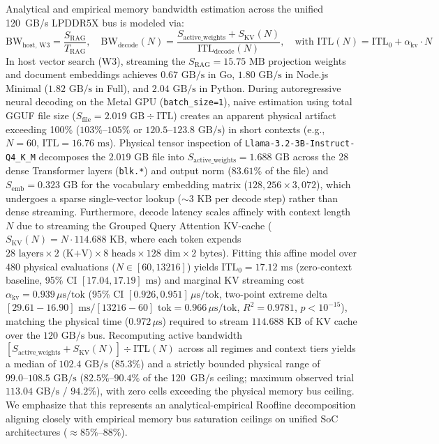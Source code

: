 \documentclass[preprint,12pt,3p]{elsarticle}
\begin{document}
Analytical and empirical memory bandwidth estimation across the unified 120~GB/s LPDDR5X bus is modeled via:
\begin{equation}
\text{BW}_{\text{host, W3}} = \frac{S_{\text{RAG}}}{T_{\text{RAG}}}, \quad \text{BW}_{\text{decode}}(N) = \frac{S_{\text{active\_weights}} + S_{\text{KV}}(N)}{\text{ITL}_{\text{decode}}(N)}, \quad \text{with } \text{ITL}(N) = \text{ITL}_0 + \alpha_{\text{kv}} \cdot N
\end{equation}
In host vector search (W3), streaming the $S_{\text{RAG}} = 15.75\text{ MB}$ projection weights and document embeddings achieves $0.67\text{ GB/s}$ in Go, $1.80\text{ GB/s}$ in Node.js Minimal ($1.82\text{ GB/s}$ in Full), and $2.04\text{ GB/s}$ in Python. During autoregressive neural decoding on the Metal GPU (\texttt{batch\_size=1}), naive estimation using total GGUF file size ($S_{\text{file}} = 2.019\text{ GB} \div \text{ITL}$) creates an apparent physical artifact exceeding 100\% ($103\%\text{--}105\%$ or $120.5\text{--}123.8\text{ GB/s}$) in short contexts (e.g., $N=60$, $\text{ITL} = 16.76\text{ ms}$). Physical tensor inspection of \texttt{Llama-3.2-3B-Instruct-Q4\_K\_M} decomposes the $2.019\text{ GB}$ file into $S_{\text{active\_weights}} = 1.688\text{ GB}$ across the 28 dense Transformer layers (\texttt{blk.*}) and output norm ($83.61\%$ of the file) and $S_{\text{emb}} = 0.323\text{ GB}$ for the vocabulary embedding matrix ($128{,}256 \times 3{,}072$), which undergoes a sparse single-vector lookup ($\sim 3\text{ KB}$ per decode step) rather than dense streaming. Furthermore, decode latency scales affinely with context length $N$ due to streaming the Grouped Query Attention KV-cache ($S_{\text{KV}}(N) = N \cdot 114.688\text{ KB}$, where each token expends $28\text{ layers} \times 2\text{ (K+V)} \times 8\text{ heads} \times 128\text{ dim} \times 2\text{ bytes}$). Fitting this affine model over 480 physical evaluations ($N \in [60, 13216]$) yields $\text{ITL}_0 = 17.12\text{ ms}$ (zero-context baseline, 95\% CI $[17.04, 17.19]\text{ ms}$) and marginal KV streaming cost $\alpha_{\text{kv}} = 0.939\,\mu\text{s/tok}$ (95\% CI $[0.926, 0.951]\,\mu\text{s/tok}$, two-point extreme delta $[29.61 - 16.90]\text{ ms} / [13216 - 60]\text{ tok} = 0.966\,\mu\text{s/tok}$, $R^2 = 0.9781$, $p < 10^{-15}$), matching the physical time ($0.972\,\mu\text{s}$) required to stream $114.688\text{ KB}$ of KV cache over the $120\text{ GB/s}$ bus. Recomputing active bandwidth $[S_{\text{active\_weights}} + S_{\text{KV}}(N)] \div \text{ITL}(N)$ across all regimes and context tiers yields a median of $102.4\text{ GB/s}$ ($85.3\%$) and a strictly bounded physical range of $99.0\text{--}108.5\text{ GB/s}$ ($82.5\%\text{--}90.4\%$ of the 120~GB/s ceiling; maximum observed trial $113.04\text{ GB/s}$ / $94.2\%$), with zero cells exceeding the physical memory bus ceiling. We emphasize that this represents an analytical-empirical Roofline decomposition \cite{williams2009roofline} aligning closely with empirical memory bus saturation ceilings on unified SoC architectures ($\approx 85\%\text{--}88\%$).
\end{document}

